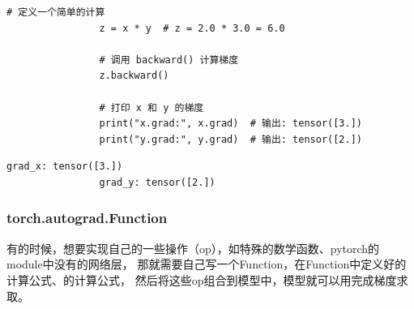 \begin{example}
\begin{enumerate}[label=\arabic*)]
\begin{lstlisting}[style=pythonstyle]
                # 定义一个简单的计算
                z = x * y  # z = 2.0 * 3.0 = 6.0
                
                # 调用 backward() 计算梯度
                z.backward()
                
                # 打印 x 和 y 的梯度
                print("x.grad:", x.grad)  # 输出: tensor([3.])
                print("y.grad:", y.grad)  # 输出: tensor([2.])
                \end{lstlisting}  
                \begin{lstlisting}[style=demostyle, numbers=none]
                grad_x: tensor([3.])
                grad_y: tensor([2.])
                \end{lstlisting}                      
        \end{enumerate}
\end{example}




\subsubsection{torch.autograd.Function}
\label{subsubsec:Pytorch的torch.autograd.Function}
有的时候，想要实现自己的一些操作（op），如特殊的数学函数、pytorch的module中没有的网络层，
那就需要自己写一个Function，在Function中定义好的计算公式、的计算公式，
然后将这些op组合到模型中，模型就可以用完成梯度求取。

